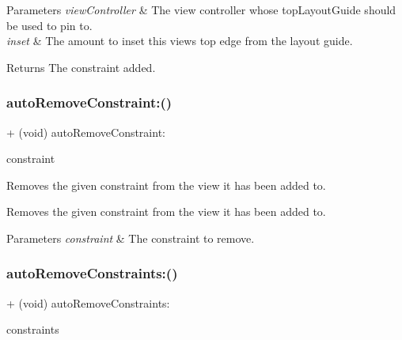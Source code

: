 \begin{DoxyParams}{Parameters}
{\em view\+Controller} & The view controller whose top\+Layout\+Guide should be used to pin to. \\
\hline
{\em inset} & The amount to inset this view\textquotesingle{}s top edge from the layout guide. \\
\hline
\end{DoxyParams}
\begin{DoxyReturn}{Returns}
The constraint added. 
\end{DoxyReturn}
\mbox{\label{category_u_i_view_07_auto_layout_08_a0a504b06b11b7d88345cb87aa63c6d47}} 
\subsubsection{\texorpdfstring{auto\+Remove\+Constraint\+:()}{autoRemoveConstraint:()}}
{\footnotesize\ttfamily + (void) auto\+Remove\+Constraint\+: \begin{DoxyParamCaption}\item[{(N\+S\+Layout\+Constraint $\ast$)}]{constraint }\end{DoxyParamCaption}}

Removes the given constraint from the view it has been added to.

Removes the given constraint from the view it has been added to.


\begin{DoxyParams}{Parameters}
{\em constraint} & The constraint to remove. \\
\hline
\end{DoxyParams}
\mbox{\label{category_u_i_view_07_auto_layout_08_a548b9f2dbc916fa03a435ab4e89d2af6}} 
\subsubsection{\texorpdfstring{auto\+Remove\+Constraints\+:()}{autoRemoveConstraints:()}}
{\footnotesize\ttfamily + (void) auto\+Remove\+Constraints\+: \begin{DoxyParamCaption}\item[{(N\+S\+Array $\ast$)}]{constraints }\end{DoxyParamCaption}}

